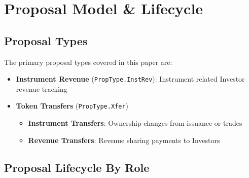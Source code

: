 \documentclass[10pt]{article}
\begin{document}
\clearpage
\section{Proposal Model \& Lifecycle}

\subsection{Proposal Types}
The primary proposal types covered in this paper are:

\begin{itemize}
    \item \textbf{Instrument Revenue} (\texttt{PropType.InstRev}): Instrument related Investor revenue tracking
    \item \textbf{Token Transfers} (\texttt{PropType.Xfer})
          \begin{itemize}
              \item \textbf{Instrument Transfers}: Ownership changes from issuance or trades
              \item \textbf{Revenue Transfers}: Revenue sharing payments to Investors
          \end{itemize}
\end{itemize}

\subsection{Proposal Lifecycle By Role}
\end{document}
